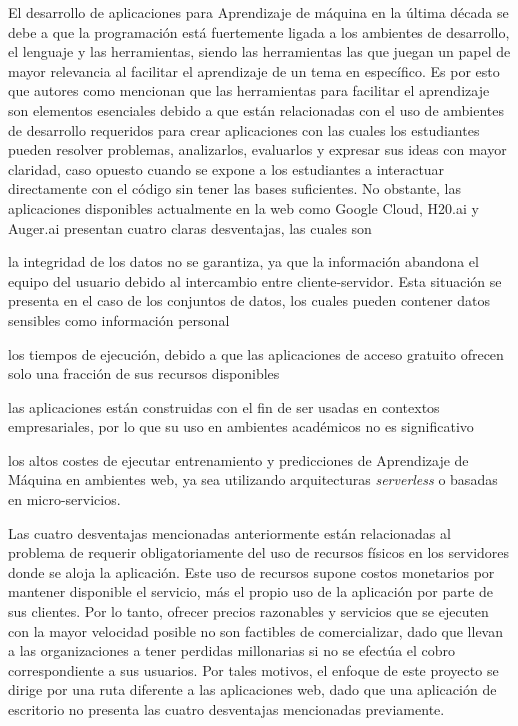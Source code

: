 El desarrollo de aplicaciones para Aprendizaje de máquina en la última década se debe a que la programación está fuertemente ligada a los ambientes de desarrollo, el lenguaje y las herramientas, siendo las herramientas las que juegan un papel de mayor relevancia al facilitar el aprendizaje de un tema en específico. Es por esto que autores como \textcite{Francis1983, Salleh2013} mencionan que las herramientas para facilitar el aprendizaje son elementos esenciales debido a que están relacionadas con el uso de ambientes de desarrollo requeridos para crear aplicaciones con las cuales los estudiantes pueden resolver problemas, analizarlos, evaluarlos y expresar sus ideas con mayor claridad, caso opuesto cuando se expone a los estudiantes a interactuar directamente con el código sin tener las bases suficientes. No obstante, las aplicaciones disponibles actualmente en la web como Google Cloud, H20.ai y Auger.ai presentan cuatro claras desventajas, las cuales son 
\begin{seriate}
    \item la integridad de los datos no se garantiza, ya que la información abandona el equipo del usuario debido al intercambio entre cliente-servidor. Esta situación se presenta en el caso de los conjuntos de datos, los cuales pueden contener datos sensibles como información personal
    \item los tiempos de ejecución, debido a que las aplicaciones de acceso gratuito ofrecen solo una fracción de sus recursos disponibles
    \item las aplicaciones están construidas con el fin de ser usadas en contextos empresariales, por lo que su uso en ambientes académicos no es significativo
    \item los altos costes de ejecutar entrenamiento y predicciones de Aprendizaje de Máquina en ambientes web, ya sea utilizando arquitecturas \textit{serverless} o basadas en micro-servicios.
\end{seriate}

Las cuatro desventajas mencionadas anteriormente están relacionadas al problema de requerir obligatoriamente del uso de recursos físicos en los servidores donde se aloja la aplicación. Este uso de recursos supone costos monetarios por mantener disponible el servicio, más el propio uso de la aplicación por parte de sus clientes. Por lo tanto, ofrecer precios razonables y servicios que se ejecuten con la mayor velocidad posible no son factibles de comercializar, dado que llevan a las organizaciones a tener perdidas millonarias si no se efectúa el cobro correspondiente a sus usuarios. Por tales motivos, el enfoque de este proyecto se dirige por una ruta diferente a las aplicaciones web, dado que una aplicación de escritorio no presenta las cuatro desventajas mencionadas previamente.




